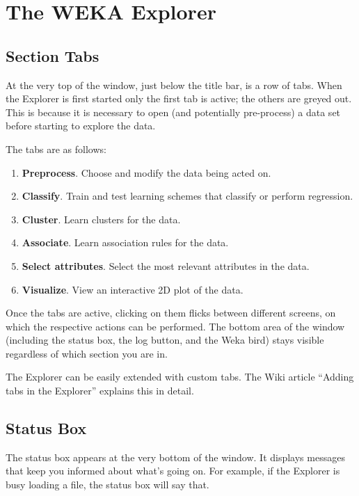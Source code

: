 \documentclass[a4paper]{article}
\begin{document}
\newpage

\section{The WEKA Explorer}

\subsection{Section Tabs}

At the very top of the window, just below the title bar, is a row of
tabs. When the Explorer is first started only the first tab is active;
the others are greyed out. This is because it is necessary to open
(and potentially pre-process) a data set before starting to explore
the data.

The tabs are as follows:

\begin{enumerate}
\item \textbf{Preprocess}.
Choose and modify the data being acted on.
\item \textbf{Classify}.
Train and test learning schemes that classify or perform regression.
\item \textbf{Cluster}.
Learn clusters for the data.
\item \textbf{Associate}.
Learn association rules for the data.
\item \textbf{Select attributes}.
Select the most relevant attributes in the data.
\item \textbf{Visualize}.
View an interactive 2D plot of the data.
\end{enumerate}
\noindent
Once the tabs are active, clicking on them flicks between different
screens, on which the respective actions can be performed.  The bottom
area of the window (including the status box, the log button, and the
Weka bird) stays visible regardless of which section you are in.

The Explorer can be easily extended with custom tabs. The Wiki 
article ``Adding tabs in the Explorer'' \cite{explorertabs} explains
this in detail.


\subsection{Status Box}

The status box appears at the very bottom of the window. It displays
messages that keep you informed about what's going on. For example, if
the Explorer is busy loading a file, the status box will say that.
\end{document}
